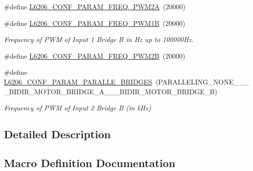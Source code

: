 \begin{DoxyCompactItemize}
\#define \mbox{\hyperlink{group___predefined___l6206___parameters___values_ga3ee9136e77c7430b856c35d18c7d8714}{L6206\+\_\+\+C\+O\+N\+F\+\_\+\+P\+A\+R\+A\+M\+\_\+\+F\+R\+E\+Q\+\_\+\+P\+W\+M2A}}~(20000)
\item 
\mbox{\label{group___predefined___l6206___parameters___values_ga64c389c682f4dae2e184c5c40dd4ac7a}} 
\#define \mbox{\hyperlink{group___predefined___l6206___parameters___values_ga64c389c682f4dae2e184c5c40dd4ac7a}{L6206\+\_\+\+C\+O\+N\+F\+\_\+\+P\+A\+R\+A\+M\+\_\+\+F\+R\+E\+Q\+\_\+\+P\+W\+M1B}}~(20000)
\begin{DoxyCompactList}\small\item\em Frequency of P\+WM of Input 1 Bridge B in Hz up to 100000\+Hz. \end{DoxyCompactList}\item 
\#define \mbox{\hyperlink{group___predefined___l6206___parameters___values_ga3426a324f20bf98ec3f24ce6c41ffbb1}{L6206\+\_\+\+C\+O\+N\+F\+\_\+\+P\+A\+R\+A\+M\+\_\+\+F\+R\+E\+Q\+\_\+\+P\+W\+M2B}}~(20000)
\item 
\mbox{\label{group___predefined___l6206___parameters___values_ga75be688fb7b0139de69bd785f3d19f3d}} 
\#define \mbox{\hyperlink{group___predefined___l6206___parameters___values_ga75be688fb7b0139de69bd785f3d19f3d}{L6206\+\_\+\+C\+O\+N\+F\+\_\+\+P\+A\+R\+A\+M\+\_\+\+P\+A\+R\+A\+L\+L\+E\+\_\+\+B\+R\+I\+D\+G\+ES}}~(P\+A\+R\+A\+L\+L\+E\+L\+I\+N\+G\+\_\+\+N\+O\+N\+E\+\_\+\+\_\+\+\_\+\_\+\+B\+I\+D\+I\+R\+\_\+\+M\+O\+T\+O\+R\+\_\+\+B\+R\+I\+D\+G\+E\+\_\+\+A\+\_\+\+\_\+\_\+\+B\+I\+D\+I\+R\+\_\+\+M\+O\+T\+O\+R\+\_\+\+B\+R\+I\+D\+G\+E\+\_\+B)
\begin{DoxyCompactList}\small\item\em Frequency of P\+WM of Input 2 Bridge B (in k\+Hz) \end{DoxyCompactList}\end{DoxyCompactItemize}


\subsection{Detailed Description}


\subsection{Macro Definition Documentation}
\mbox{\label{group___predefined___l6206___parameters___values_ga3ee9136e77c7430b856c35d18c7d8714}} 
